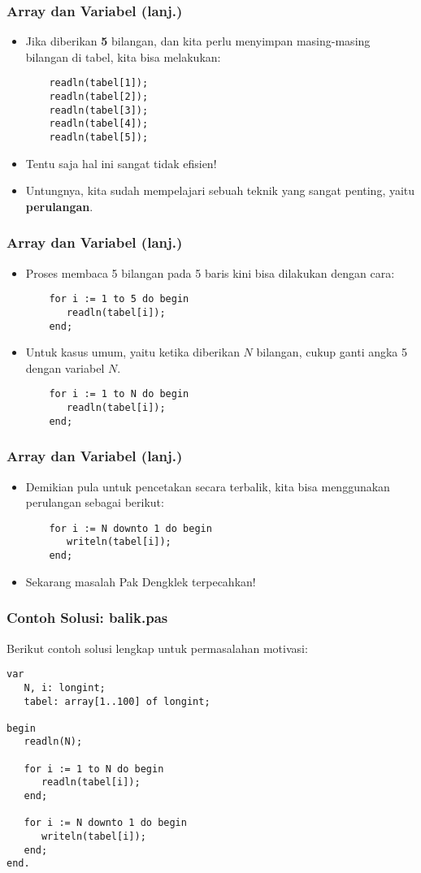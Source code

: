 \documentclass{beamer}
\begin{document}
\begin{frame}[fragile]
\frametitle{Array dan Variabel (lanj.)}
\begin{itemize}
	\item Jika diberikan \textbf{5} bilangan, dan kita perlu menyimpan masing-masing bilangan di tabel, kita bisa melakukan:
	\begin{lstlisting}
	readln(tabel[1]);
	readln(tabel[2]);
	readln(tabel[3]);
	readln(tabel[4]);
	readln(tabel[5]);		
	\end{lstlisting}
	\item Tentu saja hal ini sangat tidak efisien!
	\item Untungnya, kita sudah mempelajari sebuah teknik yang sangat penting, yaitu \textbf{perulangan}.
\end{itemize}
\end{frame}

\begin{frame}[fragile]
\frametitle{Array dan Variabel (lanj.)}
\begin{itemize}
	\item Proses membaca 5 bilangan pada 5 baris kini bisa dilakukan dengan cara:
	\begin{lstlisting}
	for i := 1 to 5 do begin
	   readln(tabel[i]);
	end;
	\end{lstlisting}
	\item Untuk kasus umum, yaitu ketika diberikan $N$ bilangan, cukup ganti angka 5 dengan variabel $N$.
	\begin{lstlisting}
	for i := 1 to N do begin
	   readln(tabel[i]);
	end;
	\end{lstlisting}
\end{itemize}
\end{frame}

\begin{frame}[fragile]
\frametitle{Array dan Variabel (lanj.)}
\begin{itemize}
	\item Demikian pula untuk pencetakan secara terbalik, kita bisa menggunakan perulangan sebagai berikut:
	\begin{lstlisting}
	for i := N downto 1 do begin
	   writeln(tabel[i]);
	end;
	\end{lstlisting}
	\item Sekarang masalah Pak Dengklek terpecahkan!
\end{itemize}
\end{frame}

\begin{frame}[fragile]
\frametitle{Contoh Solusi: balik.pas}
Berikut contoh solusi lengkap untuk permasalahan motivasi:
\begin{lstlisting}
var
   N, i: longint;
   tabel: array[1..100] of longint;

begin
   readln(N);

   for i := 1 to N do begin
      readln(tabel[i]);
   end;

   for i := N downto 1 do begin
      writeln(tabel[i]);
   end;
end.
\end{lstlisting}
\end{frame}
\end{document}
